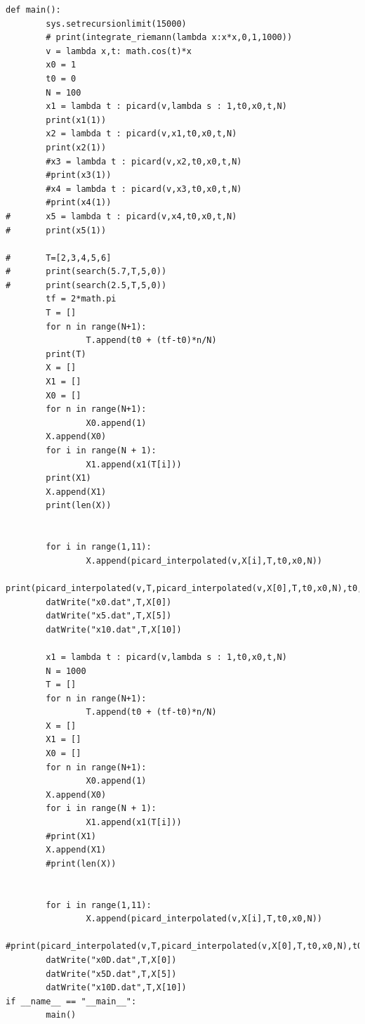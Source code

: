 \documentclass[12pt, letterpaper]{article}
\begin{document}
\begin{lstlisting}
def main():
        sys.setrecursionlimit(15000)
        # print(integrate_riemann(lambda x:x*x,0,1,1000))
        v = lambda x,t: math.cos(t)*x
        x0 = 1
        t0 = 0
        N = 100
        x1 = lambda t : picard(v,lambda s : 1,t0,x0,t,N)
        print(x1(1))
        x2 = lambda t : picard(v,x1,t0,x0,t,N)
        print(x2(1))
        #x3 = lambda t : picard(v,x2,t0,x0,t,N)
        #print(x3(1))
        #x4 = lambda t : picard(v,x3,t0,x0,t,N)
        #print(x4(1))
#       x5 = lambda t : picard(v,x4,t0,x0,t,N)
#       print(x5(1))

#       T=[2,3,4,5,6]
#       print(search(5.7,T,5,0))
#       print(search(2.5,T,5,0))
        tf = 2*math.pi
        T = []
        for n in range(N+1):
                T.append(t0 + (tf-t0)*n/N)
        print(T)
        X = []
        X1 = []
        X0 = []
        for n in range(N+1):
                X0.append(1)
        X.append(X0)
        for i in range(N + 1):
                X1.append(x1(T[i]))
        print(X1)
        X.append(X1)
        print(len(X))


        for i in range(1,11):
                X.append(picard_interpolated(v,X[i],T,t0,x0,N))
        print(picard_interpolated(v,T,picard_interpolated(v,X[0],T,t0,x0,N),t0,x0,N))
        datWrite("x0.dat",T,X[0])
        datWrite("x5.dat",T,X[5])
        datWrite("x10.dat",T,X[10])

        x1 = lambda t : picard(v,lambda s : 1,t0,x0,t,N)
        N = 1000
        T = []
        for n in range(N+1):
                T.append(t0 + (tf-t0)*n/N)
        X = []
        X1 = []
        X0 = []
        for n in range(N+1):
                X0.append(1)
        X.append(X0)
        for i in range(N + 1):
                X1.append(x1(T[i]))
        #print(X1)
        X.append(X1)
        #print(len(X))


        for i in range(1,11):
                X.append(picard_interpolated(v,X[i],T,t0,x0,N))
        #print(picard_interpolated(v,T,picard_interpolated(v,X[0],T,t0,x0,N),t0,x0,N))
        datWrite("x0D.dat",T,X[0])
        datWrite("x5D.dat",T,X[5])
        datWrite("x10D.dat",T,X[10])
if __name__ == "__main__":
        main()
	\end{lstlisting}
\end{document}
